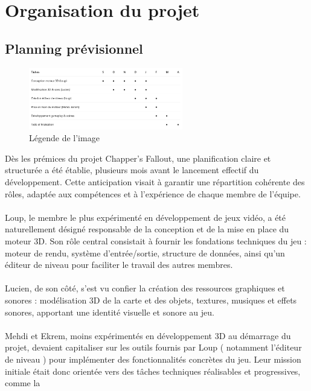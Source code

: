 \section{Organisation du projet}
    \subsection{Planning prévisionnel}

        \begin{figure}[h]
            \centering
            \includegraphics[width=0.6\textwidth]{images/gantt_previsionnel.png}
            \caption{Légende de l'image}
            \label{fig:mon_image}
        \end{figure}
        Dès les prémices du projet Chapper's Fallout, une planification claire et structurée a été établie, plusieurs mois avant le lancement effectif du développement. 
        Cette anticipation visait à garantir une répartition cohérente des rôles, adaptée aux compétences et à l'expérience de chaque membre de l'équipe.
        \\ \\
        Loup, le membre le plus expérimenté en développement de jeux vidéo, a été naturellement désigné responsable de la conception et de la mise en place du moteur 3D. 
        Son rôle central consistait à fournir les fondations techniques du jeu : moteur de rendu, système d’entrée/sortie, structure de données, ainsi qu’un éditeur de 
        niveau pour faciliter le travail des autres membres.
        \\ \\
        Lucien, de son côté, s’est vu confier la création des ressources graphiques et sonores : modélisation 3D de la carte et des objets, textures, musiques et effets 
        sonores, apportant une identité visuelle et sonore au jeu.
        \\ \\
        Mehdi et Ekrem, moins expérimentés en développement 3D au démarrage du projet, devaient capitaliser sur les outils fournis par Loup ( notamment l’éditeur de niveau  
        ) pour implémenter des fonctionnalités concrètes du jeu. Leur mission initiale était donc orientée vers des tâches techniques réalisables et progressives, comme la 
